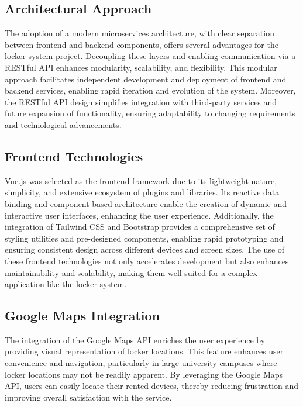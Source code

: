 \subsection{Architectural Approach}
The adoption of a modern microservices architecture, with clear separation between frontend and backend components, offers several advantages for the locker system project. Decoupling these layers and enabling communication via a RESTful API enhances modularity, scalability, and flexibility. This modular approach facilitates independent development and deployment of frontend and backend services, enabling rapid iteration and evolution of the system. Moreover, the RESTful API design simplifies integration with third-party services and future expansion of functionality, ensuring adaptability to changing requirements and technological advancements.

\subsection{Frontend Technologies}
Vue.js was selected as the frontend framework due to its lightweight nature, simplicity, and extensive ecosystem of plugins and libraries. Its reactive data binding and component-based architecture enable the creation of dynamic and interactive user interfaces, enhancing the user experience. Additionally, the integration of Tailwind CSS and Bootstrap provides a comprehensive set of styling utilities and pre-designed components, enabling rapid prototyping and ensuring consistent design across different devices and screen sizes. The use of these frontend technologies not only accelerates development but also enhances maintainability and scalability, making them well-suited for a complex application like the locker system.

\subsection{Google Maps Integration}
The integration of the Google Maps API enriches the user experience by providing visual representation of locker locations. This feature enhances user convenience and navigation, particularly in large university campuses where locker locations may not be readily apparent. By leveraging the Google Maps API, users can easily locate their rented devices, thereby reducing frustration and improving overall satisfaction with the service.

